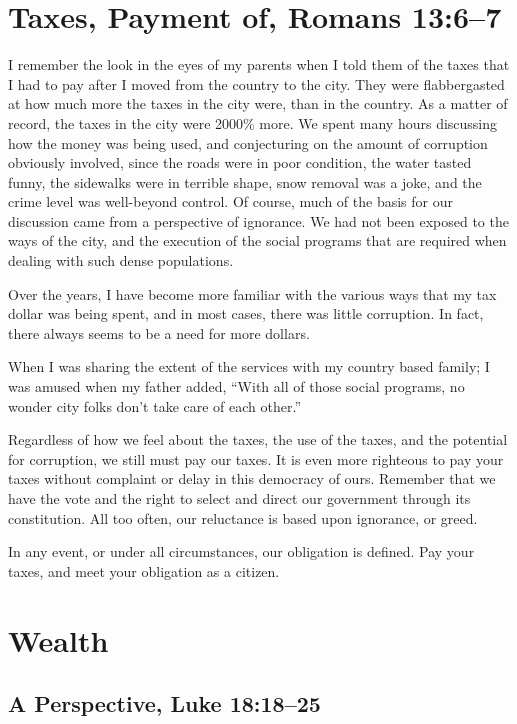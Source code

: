 \documentclass[12pt]{memoir}
\begin{document}
\section{Taxes, Payment of, Romans 13:6--7}

I remember the look in the eyes of my parents when I told them of
the taxes that I had to pay after I moved from the country to the
city. They were flabbergasted at how much more the taxes in the city
were, than in the country. As a matter of record, the taxes in the
city were 2000\% more. We spent many hours discussing how the money
was being used, and conjecturing on the amount of corruption obviously
involved, since the roads were in poor condition, the water tasted
funny, the sidewalks were in terrible shape, snow removal was a joke,
and the crime level was well-beyond control. Of course, much of the
basis for our discussion came from a perspective of ignorance. We
had not been exposed to the ways of the city, and the execution of
the social programs that are required when dealing with such dense
populations. 

Over the years, I have become more familiar with the various ways
that my tax dollar was being spent, and in most cases, there was little
corruption. In fact, there always seems to be a need for more dollars.

When I was sharing the extent of the services with my country based
family; I was amused when my father added, ``With all of those social
programs, no wonder city folks don't take care of each other.'' 

Regardless of how we feel about the taxes, the use of the taxes, and
the potential for corruption, we still must pay our taxes. It is even
more righteous to pay your taxes without complaint or delay in this
democracy of ours. Remember that we have the vote and the right to
select and direct our government through its constitution. All too
often, our reluctance is based upon ignorance, or greed. 

In any event, or under all circumstances, our obligation is defined.
Pay your taxes, and meet your obligation as a citizen. 

\section{Wealth}

\subsection{A Perspective, Luke 18:18--25}
\end{document}
